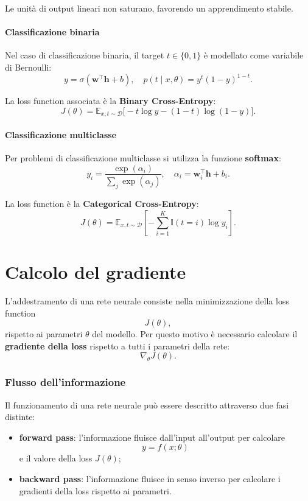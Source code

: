 \documentclass[a4paper,12pt]{report}
\begin{document}
Le unità di output lineari non saturano, favorendo un apprendimento stabile.

\paragraph{Classificazione binaria}
Nel caso di classificazione binaria, il target $t \in \{0,1\}$ è modellato come variabile di Bernoulli:
\[
y = \sigma(\mathbf{w}^\top \mathbf{h} + b),
\quad
p(t \mid x, \theta) = y^t(1-y)^{1-t}.
\]

La loss function associata è la \textbf{Binary Cross-Entropy}:
\[
J(\theta) =
\mathbb{E}_{x,t \sim \mathcal{D}}
\bigl[
- t \log y - (1-t) \log (1-y)
\bigr].
\]

\paragraph{Classificazione multiclasse}
Per problemi di classificazione multiclasse si utilizza la funzione \textbf{softmax}:
\[
y_i = \frac{\exp(\alpha_i)}{\sum_j \exp(\alpha_j)},
\quad
\alpha_i = \mathbf{w}_i^\top \mathbf{h} + b_i.
\]

La loss function è la \textbf{Categorical Cross-Entropy}:
\[
J(\theta) =
\mathbb{E}_{x,t \sim \mathcal{D}}
\left[
- \sum_{i=1}^{K} \mathbb{I}(t=i)\log y_i
\right].
\]

\section{Calcolo del gradiente}

L’addestramento di una rete neurale consiste nella minimizzazione della loss function
\[
J(\theta),
\]
rispetto ai parametri $\theta$ del modello.  
Per questo motivo è necessario calcolare il \textbf{gradiente della loss} rispetto a tutti i parametri della rete:
\[
\nabla_{\theta} J(\theta).
\]

\subsubsection{Flusso dell’informazione}

Il funzionamento di una rete neurale può essere descritto attraverso due fasi distinte:

\begin{itemize}
    \item \textbf{forward pass}: l’informazione fluisce dall’input all’output per calcolare
    \[
    y = f(x;\theta)
    \]
    e il valore della loss $J(\theta)$;
    \item \textbf{backward pass}: l’informazione fluisce in senso inverso per calcolare i gradienti della loss rispetto ai parametri.
\end{itemize}
\end{document}
